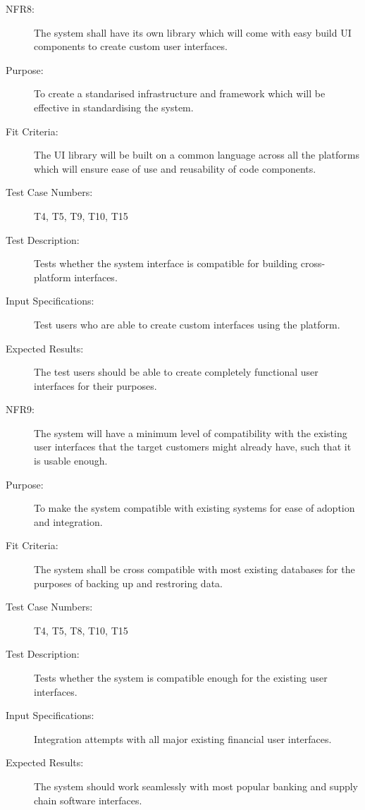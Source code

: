 \documentclass[a4paper,twoside,phd]{BYUPhys}
\begin{document}
\begin{description}
\item[NFR8:] The system shall have its own library which will come with easy build UI components to create custom user interfaces.
\item[Purpose:] To create a standarised infrastructure and framework which will be effective in standardising the system.
\item[Fit Criteria:] The UI library will be built on a common language across all the platforms which will ensure ease of use and reusability of code components.
\item[Test Case Numbers:] T4, T5, T9, T10, T15
\item[Test Description:] Tests whether the system interface is compatible for building cross-platform interfaces.
\item[Input Specifications:] Test users who are able to create custom interfaces using the platform. 
\item[Expected Results:] The test users should be able to create completely functional user interfaces for their purposes.

\item[NFR9:] The system will have a minimum level of compatibility with the existing user interfaces that the target customers might already have, such that it is usable enough.
\item[Purpose:] To make the system compatible with existing systems for ease of adoption and integration.
\item[Fit Criteria:] The system shall be cross compatible with most existing databases for the purposes of backing up and restroring data.
\item[Test Case Numbers:] T4, T5, T8, T10, T15
\item[Test Description:] Tests whether the system is compatible enough for the existing user interfaces.
\item[Input Specifications:] Integration attempts with all major existing financial user interfaces.
\item[Expected Results:] The system should work seamlessly with most popular banking and supply chain software interfaces.
\end{description}
\end{document}

